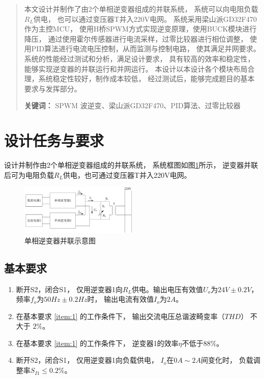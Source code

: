 \documentclass[a4paper,12pt]{article}
\begin{document}



\newpage
\begin{abstract}
本文设计并制作了由2个单相逆变器组成的并联系统，
系统可以向电阻负载$R_L$供电，
也可以通过变压器T并入220V电网。
系统采用梁山派GD32F470作为主控MCU，
使用H桥SPWM方式实现逆变原理，使用BUCK模块进行降压，
通过使用霍尔传感器进行电流采样，过零比较器进行相位调整，
使用PID算法进行电流电压控制，从而监测与控制电路，
使其满足并网要求。系统的性能经过测试和分析，满足设计要求，
具有较高的效率和稳定性，能够实现逆变器的并联运行和并网运行。
本设计以本设计各个模块布局合理，系统稳定性较好，制作成本较低，
经过测试后，能够完成题目的基本要求与发挥部分。


\noindent \textbf{关键词：} 
SPWM 波逆变、梁山派GD32F470、PID算法、过零比较器
\end{abstract}

\newpage

\tableofcontents

\newpage

\section{设计任务与要求}
设计并制作由2个单相逆变器组成的并联系统，
系统框图如图\ref{fig1}所示，
逆变器并联后可为电阻负载$R_L$供电，也可通过变压器T并入220V电网。
\begin{figure}[htbp]
\centering
\includegraphics[width=0.5\textwidth]{src/fig1.png}
\caption{单相逆变器并联示意图}
\label{fig1}
\end{figure}
\subsection{基本要求}
\begin{enumerate}
    \item 断开S2，闭合S1，
    仅用逆变器1向$R_L$供电。输出电压有效值$U_o$为$24V\pm0.2V$，
    频率$f_o$为$50Hz\pm0.2Hz$时，
    输出电流有效值$I_o$为$2A$。\label{item:1}
    \item 在基本要求 \ref{item:1} 的工作条件下，
    输出交流电压总谐波畸变率（$THD$） 不大于 $2\%$。
    \item 在基本要求 \ref{item:1} 的工作条件下，
    逆变器1的效率$\eta$不低于$88\%$。
    \item 断开S2，闭合S1，
    仅用逆变器1向负载供电，
    $I_o$在$0A\sim 2A$间变化时，
    负载调整率$S_{I1}\leqslant 0.2\%$。
\end{enumerate}
\end{document}

